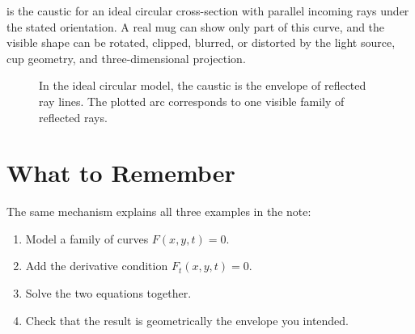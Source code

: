 \documentclass[11pt]{article}
\begin{document}
\begin{warningbox}[title=Modeling caveat]
 is the caustic for an ideal circular cross-section with parallel incoming rays under the stated orientation. A real mug can show only part of this curve, and the visible shape can be rotated, clipped, blurred, or distorted by the light source, cup geometry, and three-dimensional projection.
\end{warningbox}

\begin{figure}[htbp]
  \centering
  \caption{In the ideal circular model, the caustic is the envelope of reflected ray lines. The plotted arc corresponds to one visible family of reflected rays.}
  \label{fig:cup-caustic}
\end{figure}

\section{What to Remember}

The same mechanism explains all three examples in the note:
\begin{enumerate}
  \item Model a family of curves \(F(x,y,t)=0\).
  \item Add the derivative condition \(F_t(x,y,t)=0\).
  \item Solve the two equations together.
  \item Check that the result is geometrically the envelope you intended.
\end{enumerate}
\end{document}
